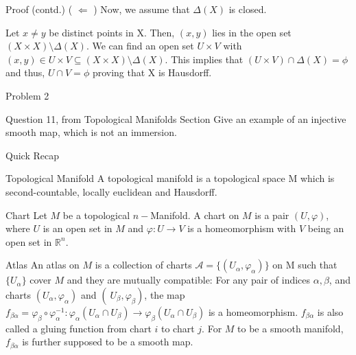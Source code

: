 \documentclass{beamer}
\begin{document}
\begin{frame}
    \begin{block}{Proof (contd.)}
    ( $\Longleftarrow$ ) Now, we assume that $\Delta(X)$ is closed. 
    
    Let $x \neq y$ be distinct points in X. Then, $(x,y)$ lies in the open set $(X \times X) \setminus \Delta(X)$. We can find an open set $U \times V$ with $(x,y) \in U \times V \subseteq (X\times X) \setminus \Delta(X)$. This implies that $(U \times V) \cap \Delta(X) = \phi$ and thus, $U \cap V = \phi$ proving that X is Hausdorff.  \qedsymbol
    \end{block}
    
\end{frame}

\begin{frame}{Problem 2}
    \begin{block}{Question 11, from Topological Manifolds Section}
     Give an example of an injective smooth map, which is not an immersion.
    \end{block}
   
\end{frame}

\begin{frame}{Quick Recap}
    \begin{block}{Topological Manifold} 
    A topological manifold is a topological space M which is second-countable, locally euclidean and Hausdorff.
    \end{block}
    
    \begin{block}{Chart}
    Let $M$ be a topological $n-$Manifold. A chart on $M$ is a pair $(U,\varphi)$, where $U$ is an open set in $M$ and $\varphi: U \to V$ is a homeomorphism with $V$ being an open set in $\mathbb{R}^n$.
    \end{block}
    
    \begin{block}{Atlas}
    An atlas on $M$ is a collection of charts $\mathscr{A} = \{(U_\alpha,\varphi_{\alpha})\}$ on M such that $\{U_\alpha\}$ cover $M$ and they are mutually compatible: For any pair of indices $\alpha, \beta$, and charts $(U_\alpha,\varphi_{\alpha})$ and $(\ U_{\beta},\varphi_{\beta})$, the map $f_{\beta \alpha} = \varphi_\beta \circ \varphi_\alpha ^{-1}:  \varphi_{\alpha}(U_{\alpha} \cap U_{\beta}) \to \varphi_{\beta}(U_\alpha \cap U_\beta)$ is a homeomorphism. $f_{\beta \alpha}$ is also called a gluing function from chart $i$ to chart $j$. For $M$ to be a smooth manifold, $f_{\beta \alpha}$ is further supposed to be a smooth map.
    \end{block}
    
\end{frame}
\end{document}
